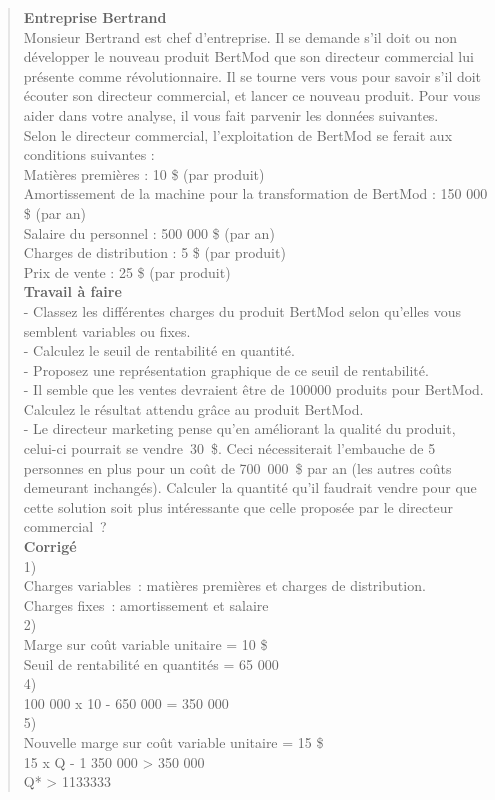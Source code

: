 \documentclass{tufte-handout}
\begin{document}
\begin{enumerate}
\begin{verse}
\textbf{Entreprise Bertrand}\\
Monsieur Bertrand est chef d'entreprise. Il se demande s'il doit ou non développer le nouveau produit BertMod que son directeur commercial lui présente comme révolutionnaire. Il se tourne vers vous pour savoir s'il doit écouter son directeur commercial, et lancer ce nouveau produit. Pour vous aider dans votre analyse, il vous fait parvenir les données suivantes.\\
Selon le directeur commercial, l'exploitation de BertMod se ferait aux conditions suivantes :\\
Matières premières : 10 \$ (par produit)\\
Amortissement de la machine pour la transformation de BertMod : 150 000 \$ (par an)\\
Salaire du personnel : 500 000 \$ (par an)\\
Charges de distribution : 5 \$ (par produit)\\
Prix de vente : 25 \$ (par produit)\\
\textbf{Travail à faire}\\
- Classez les différentes charges du produit BertMod selon qu'elles vous semblent variables ou fixes.\\
- Calculez le seuil de rentabilité en quantité.\\
- Proposez une représentation graphique de ce seuil de rentabilité.\\
- Il semble que les ventes devraient être de 100000 produits pour BertMod. Calculez le résultat attendu grâce au produit BertMod.\\
- Le directeur marketing pense qu'en améliorant la qualité du produit, celui-ci pourrait se vendre 30 \$. Ceci nécessiterait l'embauche de 5 personnes en plus pour un coût de 700 000 \$ par an (les autres coûts demeurant inchangés). Calculer la quantité qu'il faudrait vendre pour que cette solution soit plus intéressante que celle proposée par le directeur commercial ?\\
\textbf{Corrigé}\\
1)\\
Charges variables : matières premières et charges de distribution.\\
Charges fixes : amortissement et salaire\\
2)\\
Marge sur coût variable unitaire = 10 \$\\
Seuil de rentabilité en quantités = 65 000\\
4)\\
100 000 x 10 - 650 000 = 350 000\\
5)\\
Nouvelle marge sur coût variable unitaire = 15 \$\\
15 x Q - 1 350 000 > 350 000\\
Q* > 1133333\\
\end{verse}



\end{enumerate}
\end{document}
